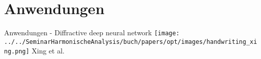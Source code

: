 \section{Anwendungen}




\begin{frame}{Anwendungen - Diffractive deep neural network}
    \centering
    \texttt{[image: ../../SeminarHarmonischeAnalysis/buch/papers/opt/images/handwriting\_xing.png]}
    \vfill
    Xing et al. \cite{opt:Lin.2018}
\end{frame}

